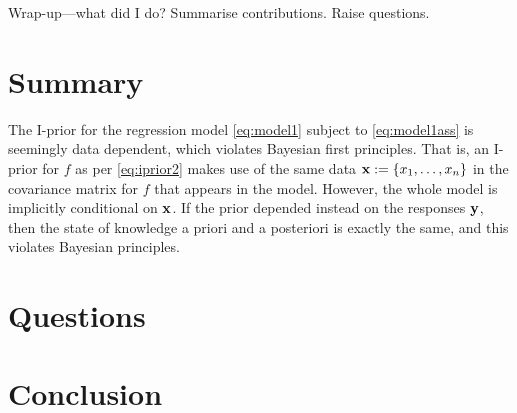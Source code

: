 \documentclass[a4paper,showframe,11pt]{report}
\begin{document}

Wrap-up---what did I do? Summarise contributions. Raise questions.

\section{Summary}

The I-prior for the regression model \cref{eq:model1} subject to \cref{eq:model1ass} is seemingly data dependent, which violates Bayesian first principles.
That is, an I-prior for $f$ as per \cref{eq:iprior2} makes use of the same data ${\mathbf x}:=\{x_1,\dots,x_n\}$ in the covariance matrix for $f$ that appears in the model.
However, the whole model is implicitly conditional on ${\mathbf x}$.
If the prior depended instead on the responses ${\mathbf y}$, then the state of knowledge a priori and a posteriori is exactly the same, and this violates Bayesian principles.

\section{Questions}

\section{Conclusion}

\hClosingStuffStandalone
\end{document}
